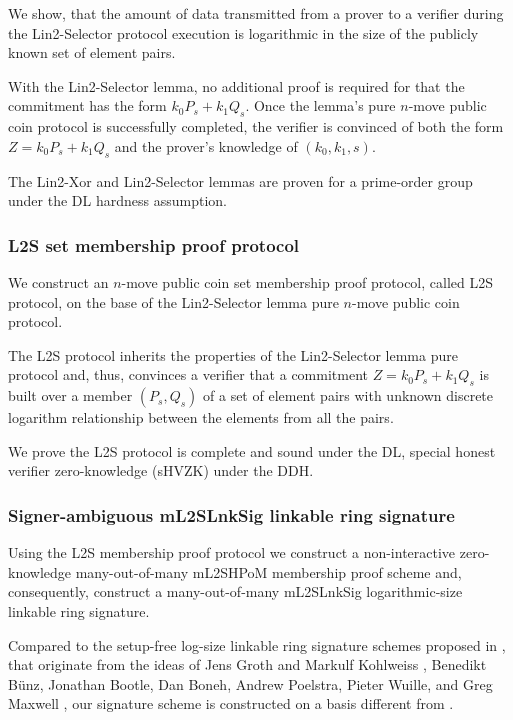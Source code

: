\documentclass{mathcryptology} %
\theoremstyle{title}
\theoremstyle{titleof}
\begin{document}
    We show, that the amount of data transmitted from a prover to a verifier during the Lin2-Selector protocol execution is logarithmic in the size of the publicly known set of element pairs.

    With the Lin2-Selector lemma, no additional proof is required for that the commitment has the form $k_{0}P_{s}+k_{1}Q_{s}$. Once the lemma's pure $n$-move public coin protocol is successfully completed, the verifier is convinced of both the form $Z=k_{0}P_{s}+k_{1}Q_{s}$ and the prover's knowledge of $\left(k_{0}, k_{1}, s\right)$.

    The Lin2-Xor and Lin2-Selector lemmas are proven for a prime-order group under the DL hardness assumption.


\subsubsection{L2S set membership proof protocol}
    We construct an $n$-move public coin set membership proof protocol, called L2S protocol, on the base of the Lin2-Selector lemma pure $n$-move public coin protocol.

    The L2S protocol inherits the properties of the Lin2-Selector lemma pure protocol and, thus, convinces a verifier that a commitment $Z=k_{0}P_{s}+k_{1}Q_{s}$ is built over a member $\left(P_{s}, Q_{s}\right)$ of a set of element pairs with unknown discrete logarithm relationship between the elements from all the pairs.

    We prove the L2S protocol is complete and sound under the DL, special honest verifier zero-knowledge (sHVZK) under the DDH.


\subsubsection{Signer-ambiguous mL2SLnkSig linkable ring signature}
    Using the L2S membership proof protocol we construct a non-interactive zero-knowledge many-out-of-many mL2SHPoM membership proof scheme and, consequently, construct a many-out-of-many mL2SLnkSig logarithmic-size linkable ring signature.

    Compared to the setup-free log-size linkable ring signature schemes proposed in \cite{18,14,6,12}, that originate from the ideas of Jens Groth and Markulf Kohlweiss \cite{9}, Benedikt Bünz, Jonathan Bootle, Dan Boneh, Andrew Poelstra, Pieter Wuille, and Greg Maxwell \cite{2}, our signature scheme is constructed on a basis different from \cite{9,2}.
\end{document}
